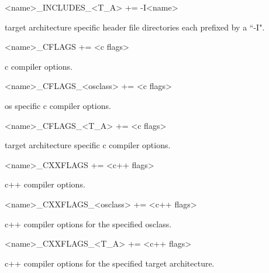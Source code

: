 \begin{description}\item \textless{}name\textgreater{}\_INCLUDES\_\textless{}T\_A\textgreater{} += -I\textless{}name\textgreater{}

\end{description}target architecture specific header file directories each prefixed by a ``-I".

\begin{description}\item \textless{}name\textgreater{}\_CFLAGS += \textless{}c flags\textgreater{}

\end{description}c compiler options.

\begin{description}\item \textless{}name\textgreater{}\_CFLAGS\_\textless{}osclass\textgreater{} += \textless{}c flags\textgreater{}

\end{description}os specific c compiler options.

\begin{description}\item \textless{}name\textgreater{}\_CFLAGS\_\textless{}T\_A\textgreater{} += \textless{}c flags\textgreater{}

\end{description}target architecture specific c compiler options.

\begin{description}\item \textless{}name\textgreater{}\_CXXFLAGS += \textless{}c++ flags\textgreater{}

\end{description}c++ compiler options.

\begin{description}\item \textless{}name\textgreater{}\_CXXFLAGS\_\textless{}osclass\textgreater{} += \textless{}c++ flags\textgreater{}

\end{description}c++ compiler options for the specified osclass.

\begin{description}\item \textless{}name\textgreater{}\_CXXFLAGS\_\textless{}T\_A\textgreater{} += \textless{}c++ flags\textgreater{}

\end{description}c++ compiler options for the specified target architecture.

